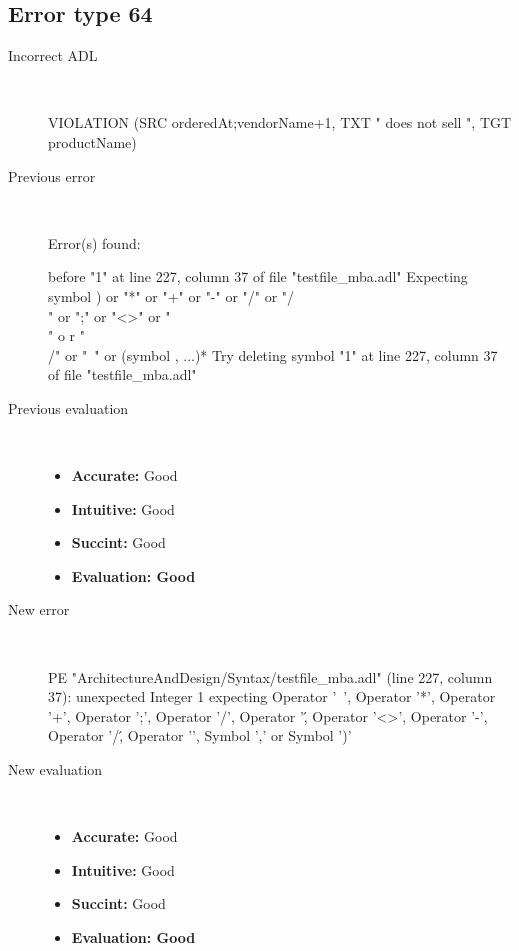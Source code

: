 \hrulefill

\subsection{Error type 64}
  \begin{description}
  \item[Incorrect ADL]~\\
\begin{adl}
VIOLATION (SRC orderedAt;vendorName+1, TXT " does not sell ", TGT productName)\end{adl}
  \item[Previous error]~\\
\begin{haskell}
Error(s) found:

before "1" at line 227, column 37 of file "testfile_mba.adl"
Expecting symbol ) or "*" or "+" or "-" or "/" or "/\\" or ";" or "<>" or "\\" o
r "\\/" or "~" or (symbol , ...)*
Try deleting symbol "1" at line 227, column 37 of file "testfile_mba.adl"

\end{haskell}
  \item[Previous evaluation]~\\
    \begin{itemize}
    \item \textbf{Accurate:} Good
    \item \textbf{Intuitive:} Good
    \item \textbf{Succint:} Good
    \item \textbf{Evaluation: Good}
    \end{itemize}
  \item[New error]~\\
\begin{haskell}
PE "ArchitectureAndDesign/Syntax/testfile_mba.adl" (line 227, column 37):
unexpected Integer 1
expecting Operator '~', Operator '*', Operator '+', Operator ';', Operator '/', Operator '\', Operator '<>', Operator '-', Operator '/\', Operator '\/', Symbol ',' or Symbol ')'\end{haskell}
  \item[New evaluation]~\\
    \begin{itemize}
    \item \textbf{Accurate:} Good
    \item \textbf{Intuitive:} Good
    \item \textbf{Succint:} Good
    \item \textbf{Evaluation: Good
}
    \end{itemize}
  \end{description}

